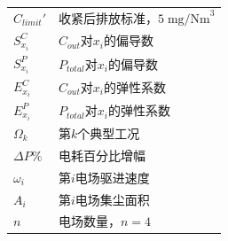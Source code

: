 \begin{longtable}{>{\centering\arraybackslash}p{}>{\centering\arraybackslash}p{}}
  $C_{limit}'$ & 收紧后排放标准，$5\;\text{mg/Nm}^3$ \\
  $S_{x_i}^C$ & $C_{out}$对$x_i$的偏导数 \\
  $S_{x_i}^P$ & $P_{total}$对$x_i$的偏导数 \\
  $E_{x_i}^C$ & $C_{out}$对$x_i$的弹性系数 \\
  $E_{x_i}^P$ & $P_{total}$对$x_i$的弹性系数 \\
  $\Omega_k$ & 第$k$个典型工况 \\
  $\Delta P\%$ & 电耗百分比增幅 \\
  $\omega_i$ & 第$i$电场驱进速度 \\
  $A_i$ & 第$i$电场集尘面积 \\
  $n$ & 电场数量，$n=4$ \\
\end{longtable}
